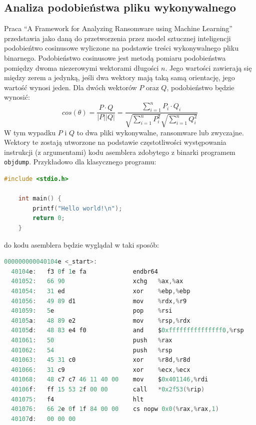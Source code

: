 \subsection{Analiza podobieństwa pliku wykonywalnego}
Praca \foreignquote{english}{A Framework for Analyzing Ransomware using
Machine Learning}~\cite{8628743} przedstawia jako daną do przetworzenia 
przez model sztucznej inteligencji podobieńtwo cosinusowe wyliczone na 
podstawie treści wykonywalnego pliku binarnego. Podobieństwo cosinusowe
jest metodą pomiaru podobieństwa pomiędzy dwoma niezerowymi wektorami długości $n$.
Jego wartości zawierają się między zerem a jedynką, jeśli dwa wektory mają taką samą
orientację, jego wartość wynosi jeden. Dla dwóch wektorów $P$ oraz $Q$, podobieństwo 
będzie wynosić:
$$
cos(\theta) = \frac{P \cdot Q}{|P||Q|} = \frac{\sum_{i = 1}^{n} P_{i} \cdot Q_{i}}{\sqrt{\sum_{i = 1}^{n}P^{2}_{i}} \sqrt{\sum_{i = 1}^{n}Q^{2}_{i}}}
$$
W tym wypadku $P$ i  $Q$ to dwa pliki wykonywalne, ransomware lub zwyczajne. Wektory te zostają utworzone na 
podstawie częstotliwości występowania instrukcji (z argumentami) kodu asemblera zdobytego z binarki programem
\texttt{objdump}. Przykładowo dla klasycznego programu:
\begin{lstlisting}[language=C,
    backgroundcolor=\color{EEGold!5!white},
    caption={Elementarny program w C.},
    label={lst:ello}]
    #include <stdio.h>

    int main() {
        printf("Hello world!\n");
        return 0;
    }
\end{lstlisting}
do kodu asemblera będzie wyglądał w taki sposób:
\begin{lstlisting}[language=C,
    backgroundcolor=\color{EEGold!5!white},
    caption={Fragment asemblerowego kodu programu z listingu 3.},
    label={lst:ello2}]
000000000040104e <_start>:
  40104e:	f3 0f 1e fa          	endbr64
  401052:	66 90                	xchg   %ax,%ax
  401054:	31 ed                	xor    %ebp,%ebp
  401056:	49 89 d1             	mov    %rdx,%r9
  401059:	5e                   	pop    %rsi
  40105a:	48 89 e2             	mov    %rsp,%rdx
  40105d:	48 83 e4 f0          	and    $0xfffffffffffffff0,%rsp
  401061:	50                   	push   %rax
  401062:	54                   	push   %rsp
  401063:	45 31 c0             	xor    %r8d,%r8d
  401066:	31 c9                	xor    %ecx,%ecx
  401068:	48 c7 c7 46 11 40 00 	mov    $0x401146,%rdi
  40106f:	ff 15 53 2f 00 00    	call   *0x2f53(%rip) 
  401075:	f4                   	hlt
  401076:	66 2e 0f 1f 84 00 00 	cs nopw 0x0(%rax,%rax,1)
  40107d:	00 00 00 
\end{lstlisting}
